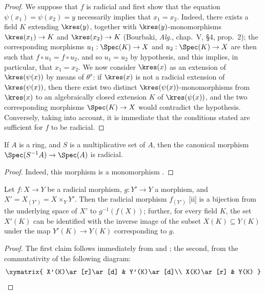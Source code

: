 \begin{proof}
We suppose that $f$ is radicial and first show that the equation $\psi(x_1)=\psi(x_2)=y$ necessarily implies that $x_1=x_2$.
Indeed, there exists a field $K$ extending $\kres(y)$, together with $\kres(y)$-monomorphisms $\kres(x_1)\to K$ and $\kres(x_2)\to K$ (Bourbaki, \emph{Alg.}, chap.~V, §4, prop.~2); the corresponding morphisms $u_1:\Spec(K)\to X$ and $u_2:\Spec(K)\to X$ are then such that $f\circ u_1=f\circ u_2$, and so $u_1=u_2$ by hypothesis, and this implies, in particular, that $x_1=x_2$.
We now consider $\kres(x)$ as an extension of $\kres(\psi(x))$ by means of $\theta^x$: if $\kres(x)$ is not a radicial extension of $\kres(\psi(x))$, then there exist two distinct $\kres(\psi(x))$-monomorphisms from $\kres(x)$ to an algebraically closed extension $K$ of $\kres(\psi(x))$, and the two corresponding morphisms $\Spec(K)\to X$ would contradict the hypothesis.
Conversely, taking  into account, it is immediate that the conditions stated are sufficient for $f$ to be radicial.
\end{proof}

\begin{corollary}[3.5.9]
\label{I.3.5.9}
If $A$ is a ring, and $S$ is a multiplicative set of $A$, then the canonical morphism $\Spec(S^{-1}A)\to\Spec(A)$ is radicial.
\end{corollary}

\begin{proof}
Indeed, this morphism is a monomorphism .
\end{proof}

\begin{corollary}[3.5.10]
\label{I.3.5.10}
Let $f:X\to Y$ be a radicial morphism, $g:Y'\to Y$ a morphism, and $X'=X_{(Y')}=X\times_Y Y'$.
Then the radicial morphism $f_{(Y')}$ [ii] is a bijection from the underlying space of $X'$ to $g^{-1}(f(X))$; further, for every field $K$, the set $X'(K)$ can be identified with the inverse image of the subset $X(K)\subseteq Y(K)$ under the map $Y'(K)\to Y(K)$ corresponding to $g$.
\end{corollary}

\begin{proof}
The first claim follows immediately from  and ; the second, from the commutativity of the following diagram:
\[
  \xymatrix{
    X'(K)\ar[r]\ar[d] &
    Y'(K)\ar[d]\\
    X(K)\ar[r] &
    Y(K)
  }
\]
\end{proof}

